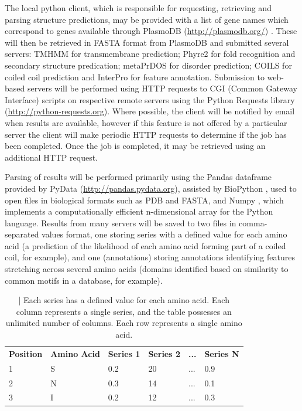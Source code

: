 \documentclass[fleqn,10pt]{article} %
\begin{document}
The local python client, which is responsible for requesting, retrieving and parsing structure predictions, may be provided with a list of gene names which correspond to genes available through PlasmoDB (\url{http://plasmodb.org/}) \cite{Aurrecoechea2009}. These will then be retrieved in FASTA format from PlasmoDB and submitted several servers: TMHMM for transmembrane prediction; Phyre2 for fold recognition and secondary structure predication; metaPrDOS for disorder prediction; COILS for coiled coil prediction and InterPro for feature annotation. Submission to web-based servers will be performed using HTTP requests to CGI (Common Gateway Interface) scripts on respective remote servers using the Python Requests library (\url{http://python-requests.org}). Where possible, the client will be notified by email when results are available, however if this feature is not offered by a particular server the client will make periodic HTTP requests to determine if the job has been completed. Once the job is completed, it may be retrieved using an additional HTTP request.

Parsing of results will be performed primarily using the Pandas dataframe provided by PyData (\url{http://pandas.pydata.org}), assisted by BioPython \cite{Cock2009}, used to open files in biological formats such as PDB and FASTA, and Numpy \cite{VanderWalt2011}, which implements a computationally efficient n-dimensional array for the Python language. Results from many servers will be saved to two files in comma-separated values format, one storing series with a defined value for each amino acid (a prediction of the likelihood of each amino acid forming part of a coiled coil, for example), and one (annotations) storing annotations identifying features stretching across several amino acids (domains identified based on similarity to common motifs in a database, for example).

\begin{table}[h]
\begin{tabular}{llllll}
\textbf{Position} & \textbf{Amino Acid} & \textbf{Series 1} & \textbf{Series 2} & \textbf{...} & \textbf{Series N} \\
1                 & S                   & 0.2               & 20                & ...          & 0.9               \\
2                 & N                   & 0.3               & 14                & ...          & 0.1               \\
3                 & I                   & 0.2               & 12                & ...          & 0.3              
\end{tabular}
\caption{ | Each series has a defined value for each amino acid. Each column represents a single series, and the table possesses an unlimited number of columns. Each row represents a single amino acid.}
\end{table}
\end{document}
